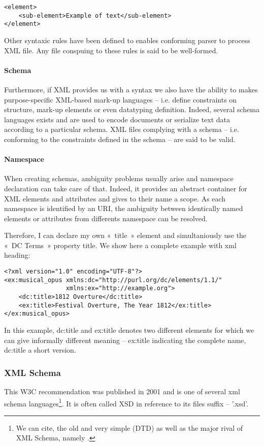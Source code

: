 \begin{Verbatim}[fontsize=\small,formatcom=\color{black!70}]
<element>
	<sub-element>Example of text</sub-element>
</element>
\end{Verbatim}

Other syntaxic rules have been defined to enables conforming parser to process XML file. Any file conspuing to these rules is said to be well-formed.

\paragraph{Schema}
Furthermore, if XML provides us with a syntax we also have the ability to makes purpose-specific XML-based mark-up languages – i.e. define constraints on structure, mark-up elements or even datatyping definition. Indeed, several schema languages exists and are used to encode documents or serialize text data according to a particular schema. XML files complying with a schema – i.e. conforming to the constraints defined in the schema – are said to be valid.

\paragraph{Namespace}
When creating schemas, ambiguity problems usually arise and namespace declaration can take care of that. Indeed, it provides an abstract container for XML elements and attributes and gives to their name a scope. As each namespace is identified by an URI, the ambiguity between identically named elements or attributes from differents namespace can be resolved. 

Therefore, I can declare my own « title » element and simultaniously use the « DC Terms » property title. We show here a complete example with xml heading:
\begin{Verbatim}[fontsize=\small,formatcom=\color{black!70}]
<?xml version="1.0" encoding="UTF-8"?>
<ex:musical_opus xmlns:dc="http://purl.org/dc/elements/1.1/"
    			 xmlns:ex="http://example.org">
	<dc:title>1812 Overture</dc:title>
    <ex:title>Festival Overture, The Year 1812</ex:title>
</ex:musical_opus>
\end{Verbatim}

In this example, dc:title and ex:title denotes two different elements for which we can give informally different meaning – ex:title indicating the complete name, dc:title a short version. 

\subsubsection*{XML Schema}
This W3C recommendation was published in 2001 and is one of several xml schema languages\footnote{We can cite, the old and very simple (DTD) as well as the major rival of XML Schema, namely .}. It is often called XSD in reference to its files suffix – '.xsd'.

